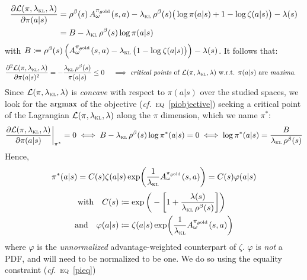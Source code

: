 \begin{align}
  \pdv{\mathcal{L}(\pi, \lambda_\textsc{kl}, \lambda)}{\pi(a | s)}
  &= \rho^\beta(s) \, A^{\pi_{\theta^\text{old}}}_\omega(s,a)
  - \lambda_\textsc{kl} \, \rho^\beta(s)
  \big(\log \pi(a | s) + 1 - \log \zeta(a | s)\big)
  - \lambda(s)
  \\
  &= B - \lambda_\textsc{kl} \, \rho^\beta(s) \log \pi(a | s)
  \label{firstderivlagragian}
\end{align}
with $B \coloneqq \rho^\beta(s) \, \Big(A^{\pi_{\theta^\text{old}}}_\omega(s,a)
- \lambda_\textsc{kl} \, \big(1 - \log \zeta(a | s)\big)\Big) - \lambda(s)$.
It follows that:
\begin{align}
  \pdv[2]{\mathcal{L}(\pi, \lambda_\textsc{kl}, \lambda)}{\pi(a | s)}
  &= - \frac{\lambda_\textsc{kl} \, \rho^\beta(s)}{\pi(a | s)} \leq 0
  \quad \implies \text{\emph{critical points} of $\mathcal{L}(\pi, \lambda_\textsc{kl}, \lambda)$
  w.r.t. $\pi(a | s)$ are \emph{maxima}.}
  \label{secondderivlagragian}
\end{align}
Since $\mathcal{L}(\pi, \lambda_\textsc{kl}, \lambda)$ is \emph{concave} with respect to $\pi(a | s)$
over the studied spaces, we look for the $\operatorname*{\arg\!\max}$ of the objective (\textit{cf.}~\textsc{eq}~\ref{piobjective})
seeking a critical point of the Lagrangian $\mathcal{L}(\pi, \lambda_\textsc{kl}, \lambda)$ along the $\pi$
dimension, which we name $\pi^*$:
\begin{align}
  \pdv{\mathcal{L}(\pi, \lambda_\textsc{kl}, \lambda)}{\pi(a | s)}\bigg|_{\pi^*} = 0
  \iff B - \lambda_\textsc{kl} \, \rho^\beta(s) \log \pi^*(a | s) = 0
  \iff \log \pi^*(a | s) = \frac{B}{\lambda_\textsc{kl} \, \rho^\beta(s)}
\end{align}
Hence,
\begin{align}
  \pi^*(a | s) = C(s) \zeta(a | s) \exp (\frac{1}{\lambda_\textsc{kl}} A^{\pi_{\theta^\text{old}}}_\omega(s,a))
  = C(s) \varphi(a | s)
\end{align}
\begin{align}
  \text{with} \quad
  C(s) &\coloneqq \exp \bigg( - \bigg[ 1 + \frac{\lambda(s)}{\lambda_\textsc{kl} \,\rho^\beta(s)} \bigg] \bigg) \\
  \text{and} \quad
  \varphi(a | s) &\coloneqq
  \zeta(a | s) \exp (\frac{1}{\lambda_\textsc{kl}} A^{\pi_{\theta^\text{old}}}_\omega(s,a))
\end{align}
where $\varphi$ is the \emph{unnormalized} advantage-weighted counterpart of $\zeta$.
$\varphi$ is \emph{not} a PDF, and will need to be normalized to be one.
We do so using the equality constraint (\textit{cf.}~\textsc{eq}~\ref{pieq})
